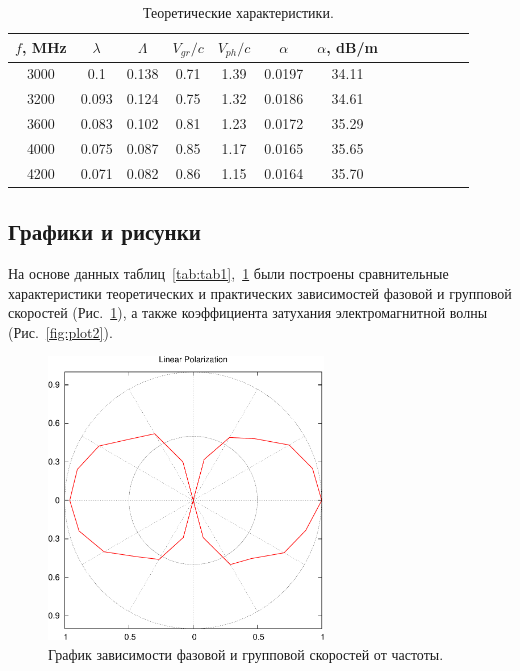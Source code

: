 \documentclass[11pt,a4paper,oneside, reqno]{amsproc}
\begin{document}
\begin{centering}
\begin{table}[h!]
\vspace{10pt}
\begin{tabular}{ccccccccccccc} \toprule %
\newcolumntype{W}{D{.}{.}{2.3}}
$f$, MHz  &  $\lambda$  &  $\Lambda$  &  $V_{gr}/c$  &  $V_{ph}/c$  &  $\alpha$  &  $\alpha$, dB/m  \\
 \midrule
3000  &  0.1    &  0.138  &  0.71  &  1.39  &  0.0197  &  34.11  \\
3200  &  0.093  &  0.124  &  0.75  &  1.32  &  0.0186  &  34.61  \\
3600  &  0.083  &  0.102  &  0.81  &  1.23  &  0.0172  &  35.29  \\
4000  &  0.075  &  0.087  &  0.85  &  1.17  &  0.0165  &  35.65  \\
4200  &  0.071  &  0.082  &  0.86  &  1.15  &  0.0164  &  35.70  \\
\bottomrule
\end{tabular}
\vspace{5 pt}
\caption{Теоретические характеристики.} 
\label{tab:tab2}
\end{table}
\end{centering}

\subsection{Графики и рисунки}
На основе данных таблиц~\ref{tab:tab1},~\ref{tab:tab2} были построены сравнительные характеристики
теоретических и практических зависимостей фазовой и групповой скоростей (Рис.~\ref{fig:plot1}), а также коэффициента
затухания электромагнитной волны (Рис.~\ref{fig:plot2}).

\begin{figure}[hb!]
    \begin{center}
        \includegraphics[width=0.65\textwidth]{data1.pdf}
    \end{center}
    \caption{График зависимости фазовой и групповой скоростей от частоты.}
    \label{fig:plot1}
\end{figure}
\end{document}

